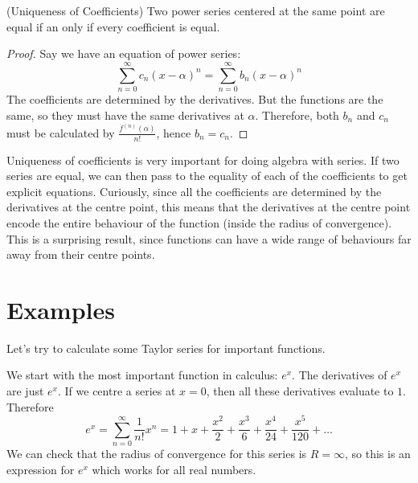 \documentclass[fleqn,letterpaper]{report}
\begin{document}
\begin{prop}
(Uniqueness of Coefficients) Two power series centered at the
same point are equal if an only if every coefficient is
equal.
\end{prop}

\begin{proof}
Say we have an equation of power series:
\begin{equation*}
\sum_{n=0}^\infty c_n (x-\alpha)^n = 
\sum_{n=0}^\infty b_n (x-\alpha)^n
\end{equation*}
The coefficients are determined by the derivatives. But 
the functions are the same, so they must have the same
derivatives at $\alpha$. Therefore, both $b_n$ and $c_n$ must
be calculated by $\frac{f^{(n)}(\alpha)}{n!}$, hence $b_n =
c_n$.
\end{proof}

Uniqueness of coefficients is very important for doing algebra
with series. If two series are equal, we can then pass to the
equality of each of the coefficients to get explicit
equations. Curiously, since all the coefficients are
determined by the derivatives at the centre point, this means
that the derivatives at the centre point encode the entire
behaviour of the function (inside the radius of convergence).
This is a surprising result, since functions can have a wide
range of behaviours far away from their centre points. 

\section{Examples}
\label{taylor-series-examples}

Let's try to calculate some Taylor series for important
functions. 

\begin{example}
We start with the most important function in
calculus: $e^x$. The derivatives of $e^x$ are just $e^x$. If
we centre a series at $x=0$, then all these derivatives
evaluate to $1$. Therefore
\begin{equation*}
e^x = \sum_{n=0}^\infty \frac{1}{n!}x^n = 1 + x + \frac{x^2}{2} +
\frac{x^3}{6} + \frac{x^4}{24} + \frac{x^5}{120} + \ldots
\end{equation*}
We can check that the radius of convergence for this series is
$R = \infty$, so this is an expression for $e^x$ which works
for all real numbers. 
\end{example}
\end{document}
